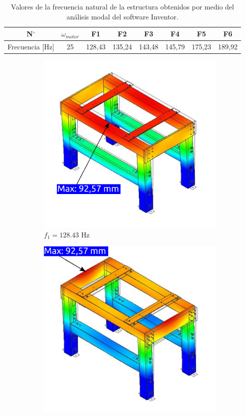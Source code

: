 \begin{table}[h]
\centering
\caption{Valores de la frecuencia natural de la estructura obtenidos por medio del análisis modal del software Inventor. }
\begin{tabular}{@{}cccccccc@{}}
\toprule
N$^{\circ}$ &  $\omega_{motor}$ & F1 & F2 & F3 & F4 & F5 & F6  \\ \midrule
Frecuencia [Hz] & 25 & 128,43 & 135,24 & 143,48 & 145,79 & 175,23 & 189,92 \\ \bottomrule
\end{tabular} 
\label{tab:frec_nat}
\end{table}

\begin{figure}[]
\centering
	\begin{subfigure}{0.5\linewidth}
		\centering
		\includegraphics[width=0.9\linewidth]{Imagenes/F1.pdf}
		\caption{$f_1 = 128.43$ Hz}\label{fig:frecuencia_1}
	\end{subfigure}%
	\begin{subfigure}{0.5\linewidth}
		\centering
		\includegraphics[width=0.9\linewidth]{Imagenes/F2.pdf}

\end{subfigure}
\end{figure}
